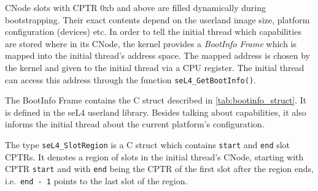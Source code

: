 CNode slots with CPTR 0xb and above are filled dynamically during
bootstrapping. Their exact contents depend on the userland image size,
platform configuration (devices) etc. In order to tell the initial thread
which capabilities are stored where in its CNode, the kernel provides
a \emph{BootInfo Frame} which is mapped into the initial thread's address
space. The mapped address is chosen by the kernel and given to the initial
thread via a CPU register. The initial thread can access this address
through the function \texttt{seL4\_GetBootInfo()}.

The BootInfo Frame contains the C struct described in
\autoref{tab:bootinfo_struct}.
It is defined in the seL4 userland library. Besides talking about
capabilities, it also informs the initial thread about
the current platform's configuration.

The type \texttt{seL4\_SlotRegion} is a C struct
which contains \texttt{start} and \texttt{end} slot CPTRs. It denotes a region
of slots in the initial thread's CNode, starting with CPTR \texttt{start} and with
\texttt{end} being the CPTR of the first slot after the region ends, i.e.\
\texttt{end - 1} points to the last slot of the region.

